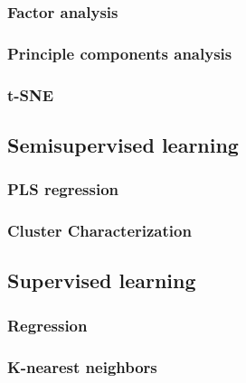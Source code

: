 \documentclass[
]{book}
\begin{document}
\hypertarget{factor-analysis}{%
\subsubsection{Factor analysis}\label{factor-analysis}}

\hypertarget{principle-components-analysis}{%
\subsubsection{Principle components analysis}\label{principle-components-analysis}}

\hypertarget{t-sne}{%
\subsubsection{t-SNE}\label{t-sne}}

\hypertarget{semisupervised-learning}{%
\subsection{Semisupervised learning}\label{semisupervised-learning}}

\hypertarget{pls-regression}{%
\subsubsection{PLS regression}\label{pls-regression}}

\hypertarget{cluster-characterization}{%
\subsubsection{Cluster Characterization}\label{cluster-characterization}}

\hypertarget{supervised-learning}{%
\subsection{Supervised learning}\label{supervised-learning}}

\hypertarget{regression}{%
\subsubsection{Regression}\label{regression}}

\hypertarget{k-nearest-neighbors}{%
\subsubsection{K-nearest neighbors}\label{k-nearest-neighbors}}
\end{document}
